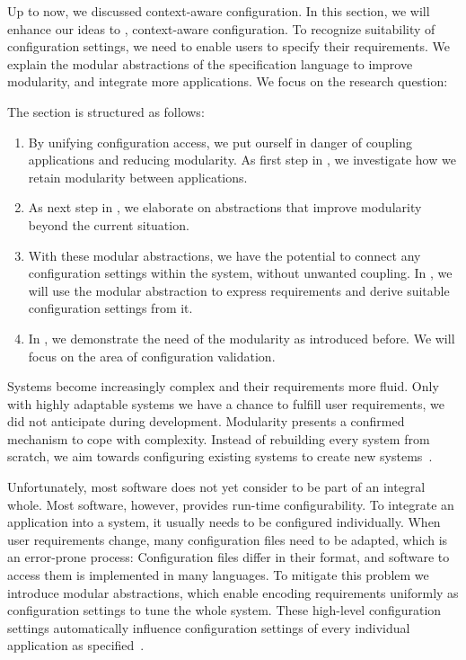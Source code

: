 Up to now, we discussed context-aware configuration.
In this section, we will enhance our ideas to , context-aware configuration.
To recognize suitability of configuration settings, we need to enable users to specify their requirements.
We explain the modular abstractions of the specification language  to improve modularity, and integrate more applications.
We focus on the research question:
\rqBackendModularAbstractions*

The section is structured as follows:
\begin{enumerate}
\item
By unifying configuration access, we put ourself in danger of coupling applications and reducing modularity.
As first step in , we investigate how we retain modularity between applications.

\item
As next step in , we elaborate on abstractions that improve modularity beyond the current situation.

\item
With these modular abstractions, we have the potential to connect any configuration settings within the system, without unwanted coupling.
In , we will use the modular abstraction to express requirements and derive suitable configuration settings from it.

\item
In , we demonstrate the need of the modularity as introduced before.
We will focus on the area of configuration validation.
\end{enumerate}


Systems become increasingly complex and their requirements more fluid.
Only with highly adaptable systems we have a chance to fulfill user requirements, we did not anticipate during development.
Modularity presents a confirmed mechanism to cope with complexity.
Instead of rebuilding every system from scratch, we aim towards configuring existing systems to create new systems~\cite{raab2016improving,assmann2003invasive}.



Unfortunately, most software does not yet consider to be part of an integral whole.
Most software, however, provides run-time configurability.
To integrate an application into a system, it usually needs to be configured individually.
When user requirements change, many configuration files need to be adapted, which is an error-prone process:
Configuration files differ in their format, and software to access them is implemented in many languages.
To mitigate this problem we introduce modular abstractions, which enable encoding requirements uniformly as configuration settings to tune the whole system.
These high-level configuration settings automatically influence configuration settings of every individual application as specified~\cite{raab2016improving}.



